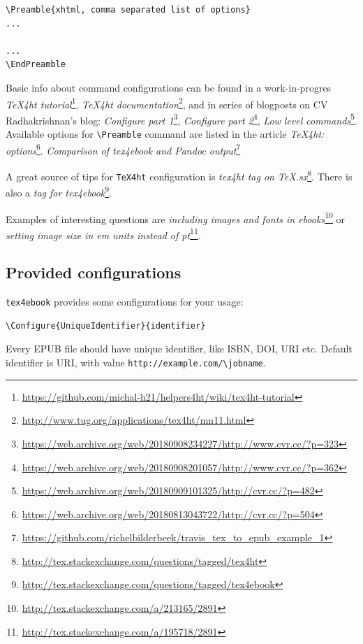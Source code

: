 \begin{verbatim}
\Preamble{xhtml, comma separated list of options}
...

...
\EndPreamble
\end{verbatim}

Basic info about command configurations can be found in a
work-in-progres \emph{TeX4ht tutorial}\footnote{\url{https://github.com/michal-h21/helpers4ht/wiki/tex4ht-tutorial}},
\emph{TeX4ht documentation}\footnote{\url{http://www.tug.org/applications/tex4ht/mn11.html}},
and in series of blogposts on CV Radhakrishnan's blog: \emph{Configure
part 1}\footnote{\url{https://web.archive.org/web/20180908234227/http://www.cvr.cc/?p=323}},
\emph{Configure part 2}\footnote{\url{https://web.archive.org/web/20180908201057/http://www.cvr.cc/?p=362}},
\emph{Low level commands}\footnote{\url{https://web.archive.org/web/20180909101325/http://cvr.cc/?p=482}}.
Available options for \texttt{\textbackslash{}Preamble} command are
listed in the article \emph{TeX4ht: options}\footnote{\url{https://web.archive.org/web/20180813043722/http://cvr.cc/?p=504}}.
\emph{Comparison of tex4ebook and Pandoc output}\footnote{\url{https://github.com/richelbilderbeek/travis_tex_to_epub_example_1}}

A great source of tips for \texttt{TeX4ht} configuration is \emph{tex4ht
tag on TeX.sx}\footnote{\url{http://tex.stackexchange.com/questions/tagged/tex4ht}}.
There is also a \emph{tag for tex4ebook}\footnote{\url{http://tex.stackexchange.com/questions/tagged/tex4ebook}}.

Examples of interesting questions are \emph{including images and fonts
in ebooks}\footnote{\url{http://tex.stackexchange.com/a/213165/2891}} or
\emph{setting image size in em units instead of pt}\footnote{\url{http://tex.stackexchange.com/a/195718/2891}}.

\hypertarget{provided-configurations}{%
\subsection{Provided configurations}\label{provided-configurations}}

\texttt{tex4ebook} provides some configurations for your usage:

\begin{verbatim}
\Configure{UniqueIdentifier}{identifier}
\end{verbatim}

Every EPUB file should have unique identifier, like ISBN, DOI, URI etc.
Default identifier is URI, with value
\texttt{http://example.com/\textbackslash{}jobname}.

